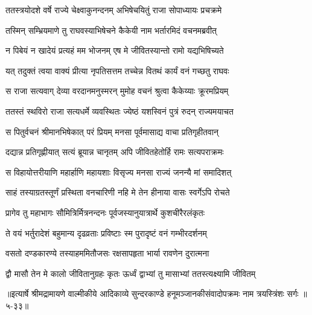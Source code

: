 \twolineshloka
{ततस्त्रयोदशे वर्षे राज्ये चेक्ष्वाकुनन्दनम्}
{अभिषेचयितुं राजा सोपाध्यायः प्रचक्रमे} %

\twolineshloka
{तस्मिन् सम्भ्रियमाणे तु राघवस्याभिषेचने}
{कैकेयी नाम भर्तारमिदं वचनमब्रवीत्} %

\twolineshloka
{न पिबेयं न खादेयं प्रत्यहं मम भोजनम्}
{एष मे जीवितस्यान्तो रामो यद्यभिषिच्यते} %

\twolineshloka
{यत् तदुक्तं त्वया वाक्यं प्रीत्या नृपतिसत्तम}
{तच्चेन्न वितथं कार्यं वनं गच्छतु राघवः} %

\twolineshloka
{स राजा सत्यवाग् देव्या वरदानमनुस्मरन्}
{मुमोह वचनं श्रुत्वा कैकेय्याः क्रूरमप्रियम्} %

\twolineshloka
{ततस्तं स्थविरो राजा सत्यधर्मे व्यवस्थितः}
{ज्येष्ठं यशस्विनं पुत्रं रुदन् राज्यमयाचत} %

\twolineshloka
{स पितुर्वचनं श्रीमानभिषेकात् परं प्रियम्}
{मनसा पूर्वमासाद्य वाचा प्रतिगृहीतवान्} %

\twolineshloka
{दद्यान्न प्रतिगृह्णीयात् सत्यं ब्रूयान्न चानृतम्}
{अपि जीवितहेतोर्हि रामः सत्यपराक्रमः} %

\twolineshloka
{स विहायोत्तरीयाणि महार्हाणि महायशाः}
{विसृज्य मनसा राज्यं जनन्यै मां समादिशत्} %

\twolineshloka
{साहं तस्याग्रतस्तूर्णं प्रस्थिता वनचारिणी}
{नहि मे तेन हीनाया वासः स्वर्गेऽपि रोचते} %

\twolineshloka
{प्रागेव तु महाभागः सौमित्रिर्मित्रनन्दनः}
{पूर्वजस्यानुयात्रार्थे कुशचीरैरलंकृतः} %

\twolineshloka
{ते वयं भर्तुरादेशं बहुमान्य दृढव्रताः}
{प्रविष्टाः स्म पुरादृष्टं वनं गम्भीरदर्शनम्} %

\twolineshloka
{वसतो दण्डकारण्ये तस्याहममितौजसः}
{रक्षसापहृता भार्या रावणेन दुरात्मना} %

\twolineshloka
{द्वौ मासौ तेन मे कालो जीवितानुग्रहः कृतः}
{ऊर्ध्वं द्वाभ्यां तु मासाभ्यां ततस्त्यक्ष्यामि जीवितम्} %


॥इत्यार्षे श्रीमद्रामायणे वाल्मीकीये आदिकाव्ये सुन्दरकाण्डे हनूमञ्जानकीसंवादोपक्रमः नाम त्रयस्त्रिंशः सर्गः ॥५-३३॥
